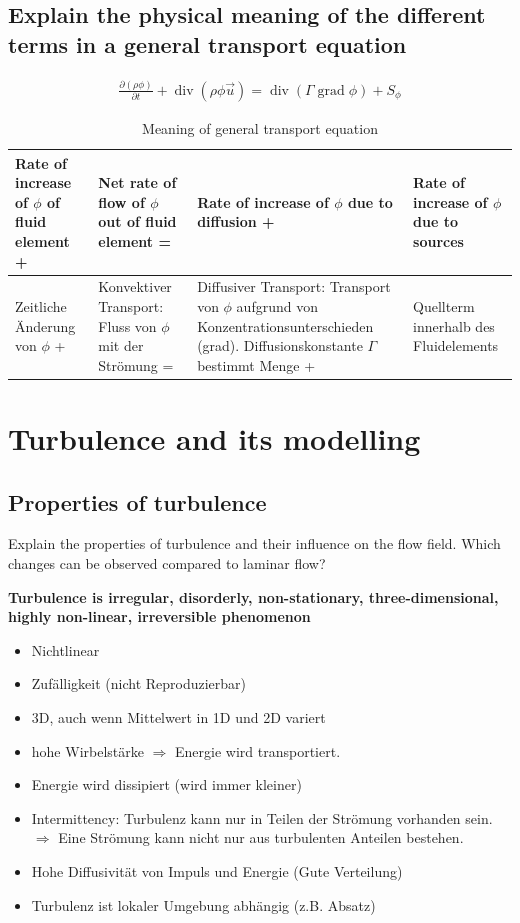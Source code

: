 \documentclass[a4paper]{scrartcl}
\begin{document}
\subsection{Explain the physical meaning of the different terms in a general
transport equation}

\begin{align}
\frac{\partial(\rho \phi)}{\partial t} + \operatorname{div}(\rho\phi\vec
u)=\operatorname{div}(\Gamma \operatorname{grad} \phi) + S_\phi
\end{align}

\begin{table}[h]
\begin{center}
\begin{tabular}{|p{3cm}|p{3cm}|p{3cm}|p{3cm}|}
\hline Rate of increase of $\phi$ of fluid element +& Net rate of flow of $\phi$
out of fluid element =& Rate of increase of $\phi$ due to diffusion +& Rate of
increase of $\phi$ due to sources \\
\hline Zeitliche Änderung von $\phi$  +& Konvektiver Transport: Fluss von $\phi$
mit der Strömung =& Diffusiver Transport: Transport von $\phi$ aufgrund von
Konzentrationsunterschieden (grad). Diffusionskonstante $\Gamma$ bestimmt Menge
+& Quellterm innerhalb des Fluidelements \\
\hline
\end{tabular}
\caption{Meaning of general transport equation}
\end{center}
\end{table}





\section{Turbulence and its modelling}

\subsection{Properties of turbulence}
Explain the properties of turbulence and their influence on the flow
field. Which changes can be observed compared to laminar flow?

\textbf{Turbulence is irregular, disorderly, non-stationary, three-dimensional,
highly non-linear, irreversible phenomenon}

\begin{itemize} 
\item Nichtlinear
\item Zufälligkeit (nicht Reproduzierbar)
\item 3D, auch wenn Mittelwert in 1D und 2D variert
\item hohe Wirbelstärke $\Rightarrow$ Energie wird transportiert.
\item Energie wird dissipiert (wird immer kleiner)
\item Intermittency: Turbulenz kann nur in Teilen der Strömung vorhanden sein.
$\Rightarrow$ Eine Strömung kann nicht nur aus turbulenten Anteilen bestehen.
\item Hohe Diffusivität von Impuls und Energie (Gute Verteilung)
\item Turbulenz ist lokaler Umgebung abhängig (z.B. Absatz)
\end{itemize}
\end{document}
